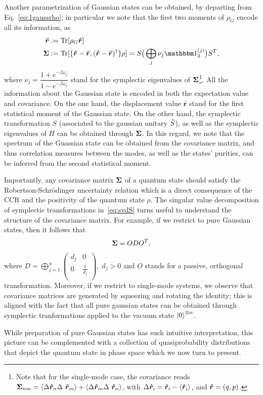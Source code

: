 Another parametrization of Gaussian states can be obtained, by departing from Eq.~\ref{eq:1gaussrho}; in particular we note that the first two moments of $\rho_G$ encode all its information, as
\begin{align}\label{eq:1moms}
 \rbar&:=\tr{\rho_G \rop}   \\
\cov&:= \tr{ \llaves{\rop - \rbar, (\rop - \rbar)^\dagger} \rho} = S \big(\bigoplus_j \nu_j \id_2^{(j)} \big)S^T,\nonumber
\end{align}
where $\nu_j = \dfrac{1+e^{-\beta \omega_j}}{1-e^{-\beta \omega_j}} $ stand for the symplectic eigenvalues of $\bm{\Sigma}$\footnote{Note that for the single-mode case, the covariance reads $\cov_{nm} = \expect{\Delta \rop_n \Delta \rop_m} + \expect{\Delta \rop_m \Delta \rop_n}$, with $\Delta \bm{\hat{r}}_i = \bm{\hat{r}}_i - \mathinner{\langle \bm{\hat{r}}_i\rangle}$, and $\bm{\hat{r}} = (q, p)$.}.
All the information about the Gaussian state is encoded in both the expectation value and covariance. On the one hand, the displacement value $\bm{\bar{r}}$ stand for the first statistical moment of the Gaussian state. On the other hand, the symplectic transformation $S$ (associated to the gaussian unitary $\hat{S}$), as well as the symplectic eigenvalues of $H$ can be obtained through $\bm{\Sigma}$. In this regard, we note that the spectrum of the Guassian state can be obtained from the covariance matrix, and thus correlation measures between the modes, as well as the states' purities, can be inferred from the second statistical moment.

Importantly, any covariance matrix $\bm{\Sigma}$ of a quantum state should satisfy the Robertson-Schrödinger uncertainty relation
which is a direct consequence of the CCR and the positivity of the quantum state $\rho$.
The singular value decomposition of symplectic transformations in~\eqref{eq:svdS} turns useful to understand the structure of the covariance matrix. For example, if we restrict to pure Gaussian states, then it follows that
\begin{align}\label{eq:pure_cov_gauss}
\bm{\Sigma} = O D O^T,
\end{align}%
where $D = \bigoplus_{j=1}^n\begin{pmatrix}d_j&0\\0&\frac{1}{d_j}\\\end{pmatrix}, \; d_j>0$ and $O$ stands for a passive, orthogonal transformation. Moreover, if we restrict to single-mode systems, we observe that covariance matrices are generated by squeezing and rotating the identity; this is aligned with the fact that all pure gaussian states can be obtained through symplectic tranformations applied to the vacuum state $\ket{0}^{\otimes n}$.

While preparation of pure Gaussian states has such intuitive interpretation, this picture can be complemented with a collection of quasiprobability distributions that depict the quantum state in phase space which we now turn to present.
